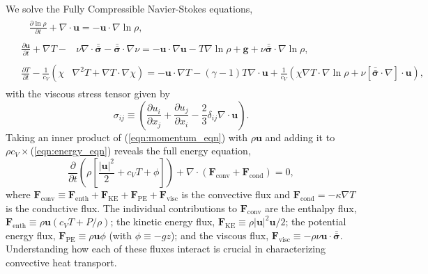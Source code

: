 \documentclass[aps, prfluids, onecolumn, notitlepage, nofootinbib, groupedaddress, amsfonts, amssymb, amsmath]{revtex4-1}
\newcommand{\Div}[1]{\ensuremath{\nabla\cdot\left( #1\right)}}
\newcommand{\grad}{\ensuremath{\nabla}}
\newcommand{\lilstressT}{\ensuremath{\bm{\bar{\bar{\sigma}}}}}
\begin{document}
We solve the Fully Compressible Navier-Stokes equations,
\begin{align}
&\begin{aligned}
&\frac{\partial \ln\rho}{\partial t} + \grad\cdot\bm{u} 
    = -\bm{u}\cdot\grad\ln\rho,
	\label{eqn:continuity_eqn}
\end{aligned}\\
&\begin{aligned}
\frac{\partial\bm{u}}{\partial t} + \grad T - 
&\nu\grad\cdot\lilstressT - \lilstressT\cdot\grad\nu =
-\bm{u}\cdot\grad\bm{u} - T\grad\ln\rho + \bm{g} + 
\nu\lilstressT\cdot\grad\ln\rho,
\label{eqn:momentum_eqn}
\end{aligned}\\
&\begin{aligned}
\frac{\partial T}{\partial t} -\frac{1}{c_V}\left(\right.\chi&\left.
    \grad^2 T + \grad T\cdot\grad\chi\right) =
	-\bm{u}\cdot\grad T - (\gamma-1)T\grad\cdot{\bm{u}}
	+ \frac{1}{c_V}\left(\chi\grad T \cdot\grad\ln\rho +
	\nu\left[\lilstressT\cdot\nabla\right]\cdot\bm{u}\right), 
	\label{eqn:energy_eqn}
\end{aligned}
\end{align}
with the viscous stress tensor given by
\begin{equation}
\sigma_{ij} \equiv \left(\frac{\partial u_i}{\partial x_j} + 
\frac{\partial u_j}{\partial x_i} - \frac{2}{3}\delta_{ij}\grad\cdot\bm{u}\right).
	\label{eqn:stress_tensor}
\end{equation}
Taking an inner product of
(\ref{eqn:momentum_eqn}) with $\rho\bm{u}$ and adding it to 
$\rho c_V\times$(\ref{eqn:energy_eqn}) reveals the full energy equation,
\begin{equation}
\frac{\partial}{\partial t}\left(\rho\left[\frac{|\bm{u}|^2}{2} + c_V T + \phi\right]\right) +
\Div{\bm{F}_{\text{conv}} + \bm{F}_{\text{cond}}} = 0,
	\label{eqn:energy_eqn_full}
\end{equation}
where
$
\bm{F}_{\text{conv}} \equiv \bm{F}_{\text{enth}} + \bm{F}_{\text{KE}} + \bm{F}_{\text{PE}} + \bm{F}_{\text{visc}}
$
is the convective flux and $\bm{F}_{\text{cond}} = -\kappa \grad T$
is the conductive flux.
The individual contributions to $\bm{F}_{\text{conv}}$ are the enthalpy flux, 
$\bm{F}_{\text{enth}} \equiv \rho\bm{u}(c_V T + P/\rho)$;
the kinetic energy flux, 
$\bm{F}_{\text{KE}} \equiv \rho|\bm{u}|^2\bm{u}/2$;
the potential energy flux,
$\bm{F}_{\text{PE}} \equiv \rho\bm{u}\phi$ (with $\phi \equiv -gz$);
and the viscous flux, 
$\bm{F}_{\text{visc}} \equiv -\rho\nu\bm{u}\cdot\lilstressT$.
Understanding how each of these fluxes interact  
is crucial in characterizing convective heat transport.
\end{document}
